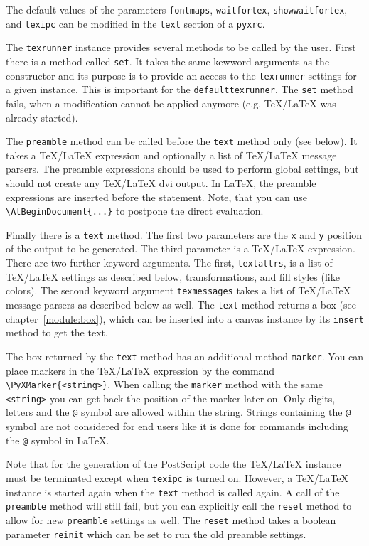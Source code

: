 \medskip

The default values of the parameters \verb|fontmaps|, \verb|waitfortex|,
\verb|showwaitfortex|, and \verb|texipc| can be modified in the \verb|text|
section of a \verb|pyxrc|.

The \verb|texrunner| instance provides several methods to be called by
the user. First there is a method called \verb|set|. It takes the same
kewword arguments as the constructor and its purpose is to provide an
access to the \verb|texrunner| settings for a given instance. This is
important for the \verb|defaulttexrunner|. The \verb|set| method
fails, when a modification cannot be applied anymore (e.g.
\TeX/\LaTeX{} was already started).

The \verb|preamble| method can be called before the \verb|text| method
only (see below). It takes a \TeX/\LaTeX{} expression and optionally
a list of \TeX/\LaTeX{} message parsers. The preamble expressions should be
used to perform global settings, but should not create any \TeX/\LaTeX{} dvi
output. In \LaTeX, the preamble expressions are inserted before the
\verb|| statement. Note, that you can use
\verb|\AtBeginDocument{...}| to postpone the direct evaluation.

Finally there is a \verb|text| method. The first two parameters are
the \verb|x| and \verb|y| position of the output to be generated. The
third parameter is a \TeX/\LaTeX{} expression. There are two further
keyword arguments. The first, \verb|textattrs|, is a list of
\TeX/\LaTeX{} settings as described below, \PyX{} transformations, and
\PyX{} fill styles (like colors). The second keyword argument
\verb|texmessages| takes a list of \TeX/\LaTeX{} message parsers as
described below as well. The \verb|text| method returns a box (see
chapter~\ref{module:box}), which can be inserted into a canvas
instance by its \verb|insert| method to get the text.

The box returned by the \verb|text| method has an additional method
\verb|marker|. You can place markers in the \TeX/\LaTeX{} expression
by the command \verb|\PyXMarker{<string>}|. When calling the
\verb|marker| method with the same \verb|<string>| you can get back the
position of the marker later on. Only digits, letters and the \verb|@|
symbol are allowed within the string. Strings containing the \verb|@|
symbol are not considered for end users like it is done for commands
including the \verb|@| symbol in \LaTeX{}.

Note that for the generation of the PostScript code the \TeX/\LaTeX{}
instance must be terminated except when \verb|texipc| is turned on.
However, a \TeX/\LaTeX{} instance is started again when the
\verb|text| method is called again. A call of the \verb|preamble|
method will still fail, but you can explicitly call the \verb|reset|
method to allow for new \verb|preamble| settings as well. The
\verb|reset| method takes a boolean parameter \verb|reinit| which can
be set to run the old preamble settings.

